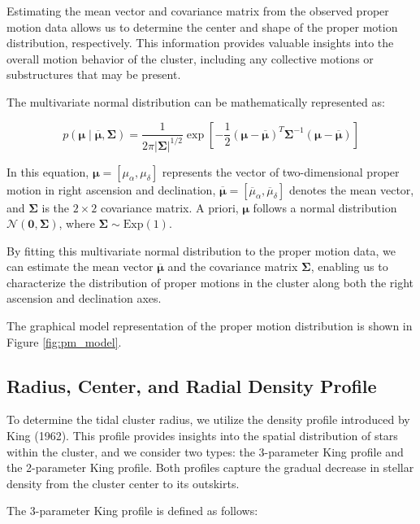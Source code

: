 \documentclass[fleqn,usenatbib,usedcolumn,useAMS]{mnras}
\begin{document}
Estimating the mean vector and covariance matrix from the observed proper motion data allows us to determine the center and shape of the proper motion distribution, respectively. This information provides valuable insights into the overall motion behavior of the cluster, including any collective motions or substructures that may be present.

The multivariate normal distribution can be mathematically represented as:

\begin{equation*}
p(\mathbf{\mu} \mid \boldsymbol{\overline{\mu}}, \boldsymbol{\Sigma}) = \frac{1}{2\pi |\boldsymbol{\Sigma}|^{1/2}} \exp{\left[-\frac{1}{2} (\mathbf{\mu} - \boldsymbol{\overline{\mu}})^T \boldsymbol{\Sigma}^{-1} (\mathbf{\mu} - \boldsymbol{\overline{\mu}})\right]}
\end{equation*}

In this equation, $\mathbf{\mu} = [\mu_\alpha, \mu_\delta]$ represents the vector of two-dimensional proper motion in right ascension and declination, $\boldsymbol{\overline{\mu}} = [\overline{\mu}_\alpha, \overline{\mu}_\delta]$ denotes the mean vector, and $\boldsymbol{\Sigma}$ is the $2 \times 2$ covariance matrix. A priori, $\boldsymbol{\mu}$ follows a normal distribution $\mathcal{N}(\boldsymbol{0}, \boldsymbol{\Sigma})$, where $\boldsymbol{\Sigma} \sim \text{Exp}(1)$.

By fitting this multivariate normal distribution to the proper motion data, we can estimate the mean vector $\boldsymbol{\overline{\mu}}$ and the covariance matrix $\boldsymbol{\Sigma}$, enabling us to characterize the distribution of proper motions in the cluster along both the right ascension and declination axes.

The graphical model representation of the proper motion distribution is shown in Figure \ref{fig:pm_model}.

\subsection{Radius, Center, and Radial Density Profile}
To determine the tidal cluster radius, we utilize the density profile introduced by King (1962). This profile provides insights into the spatial distribution of stars within the cluster, and we consider two types: the 3-parameter King profile and the 2-parameter King profile. Both profiles capture the gradual decrease in stellar density from the cluster center to its outskirts.

The 3-parameter King profile is defined as follows:
\end{document}
